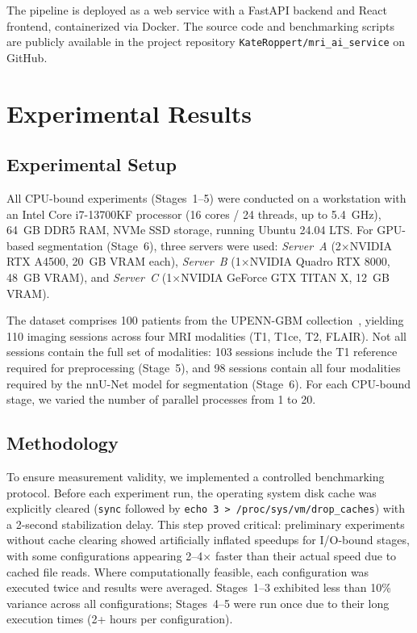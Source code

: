 \documentclass[conference]{IEEEtran}
\begin{document}
The pipeline is deployed as a web service with a FastAPI backend and React frontend, containerized via Docker. The source code and benchmarking scripts are publicly available in the project repository \texttt{KateRoppert/mri\_ai\_service} on GitHub.

\section{Experimental Results}

\subsection{Experimental Setup}

All CPU-bound experiments (Stages~1--5) were conducted on a workstation with an Intel Core i7-13700KF processor (16 cores / 24 threads, up to 5.4~GHz), 64~GB DDR5 RAM, NVMe SSD storage, running Ubuntu 24.04 LTS. For GPU-based segmentation (Stage~6), three servers were used: \textit{Server~A} (2$\times$NVIDIA RTX A4500, 20~GB VRAM each), \textit{Server~B} (1$\times$NVIDIA Quadro RTX 8000, 48~GB VRAM), and \textit{Server~C} (1$\times$NVIDIA GeForce GTX TITAN X, 12~GB VRAM).

The dataset comprises 100 patients from the UPENN-GBM collection~\cite{bakas2022}, yielding 110 imaging sessions across four MRI modalities (T1, T1ce, T2, FLAIR). Not all sessions contain the full set of modalities: 103 sessions include the T1 reference required for preprocessing (Stage~5), and 98 sessions contain all four modalities required by the nnU-Net model for segmentation (Stage~6). For each CPU-bound stage, we varied the number of parallel processes from 1 to 20.

\subsection{Methodology}

To ensure measurement validity, we implemented a controlled benchmarking protocol. Before each experiment run, the operating system disk cache was explicitly cleared (\texttt{sync} followed by \texttt{echo 3 > /proc/sys/vm/drop\_caches}) with a 2-second stabilization delay. This step proved critical: preliminary experiments without cache clearing showed artificially inflated speedups for I/O-bound stages, with some configurations appearing 2--4$\times$ faster than their actual speed due to cached file reads. Where computationally feasible, each configuration was executed twice and results were averaged. Stages~1--3 exhibited less than 10\% variance across all configurations; Stages~4--5 were run once due to their long execution times (2+ hours per configuration).
\end{document}
